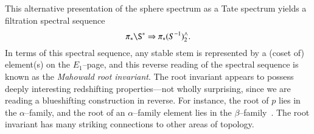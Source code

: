 This alternative presentation of the sphere spectrum as a Tate spectrum yields a filtration spectral sequence \[\pi_* \S^* \Rightarrow \pi_* (S^{-1})^\wedge_2.\]  In terms of this spectral sequence, any stable stem is represented by a (coset of) element(s) on the $E_1$--page, and this reverse reading of the spectral sequence is known as the \textit{Mahowald root invariant}.  The root invariant appears to possess deeply interesting redshifting properties---not wholly surprising, since we are reading a blueshifting construction in reverse.  For instance, the root of $p$ lies in the $\alpha$--family, and the root of an $\alpha$--family element lies in the $\beta$--family~\cite{BehrensRootInv}.  The root invariant has many striking connections to other areas of topology.

